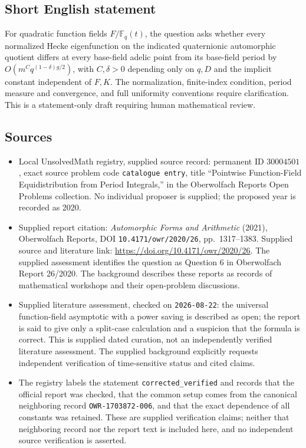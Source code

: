 \documentclass[11pt]{article}
\newcommand{\F}{\mathbb{F}}
\begin{document}
\subsection{Short English statement}
For quadratic function fields \(F/\F_q(t)\), the question asks whether every normalized Hecke eigenfunction on the indicated quaternionic automorphic quotient differs at every base-field adelic point from its base-field period by \(O(m^Cq^{(1-\delta)g/2})\), with \(C,\delta>0\) depending only on \(q,D\) and the implicit constant independent of \(F,K\). The normalization, finite-index condition, period measure and convergence, and full uniformity conventions require clarification. This is a statement-only draft requiring human mathematical review.
\subsection{Sources}
\begin{itemize}
\item Local UnsolvedMath registry, supplied source record: permanent ID \(30004501\), exact source problem code \texttt{catalogue entry}, title ``Pointwise Function-Field Equidistribution from Period Integrals,'' in the Oberwolfach Reports Open Problems collection. No individual proposer is supplied; the proposed year is recorded as 2020.
\item Supplied report citation: \emph{Automorphic Forms and Arithmetic} (2021), Oberwolfach Reports, DOI \texttt{10.4171/owr/2020/26}, pp.\ 1317--1383. Supplied source and literature link: \url{https://doi.org/10.4171/owr/2020/26}. The supplied assessment identifies the question as Question 6 in Oberwolfach Report 26/2020. The background describes these reports as records of mathematical workshops and their open-problem discussions.
\item Supplied literature assessment, checked on \texttt{2026-08-22}: the universal function-field asymptotic with a power saving is described as open; the report is said to give only a split-case calculation and a suspicion that the formula is correct. This is supplied dated curation, not an independently verified literature assessment. The supplied background explicitly requests independent verification of time-sensitive status and cited claims.
\item The registry labels the statement \texttt{corrected\_verified} and records that the official report was checked, that the common setup comes from the canonical neighboring record \texttt{OWR-1703872-006}, and that the exact dependence of all constants was retained. These are supplied verification claims; neither that neighboring record nor the report text is included here, and no independent source verification is asserted.
\end{itemize}
\end{document}
